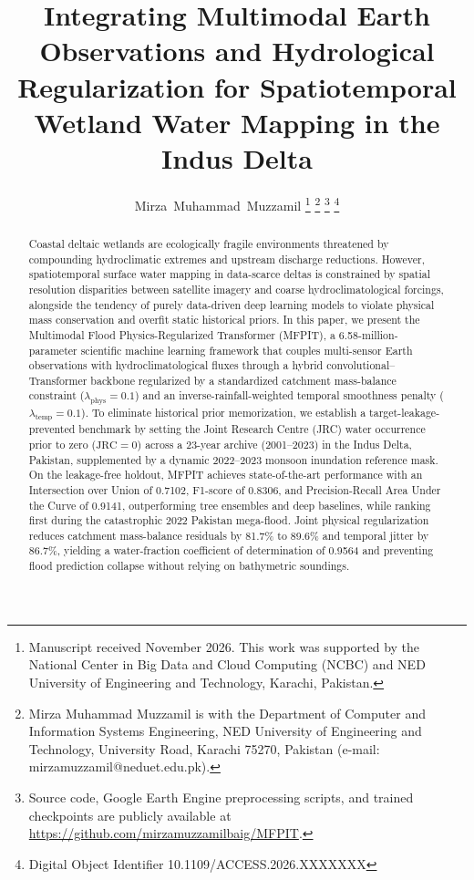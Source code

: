 \documentclass[journal]{IEEEtran}
\begin{document}

\title{Integrating Multimodal Earth Observations and Hydrological Regularization for Spatiotemporal Wetland Water Mapping in the Indus Delta}

\author{Mirza~Muhammad~Muzzamil%
\thanks{Manuscript received November 2026. This work was supported by the National Center in Big Data and Cloud Computing (NCBC) and NED University of Engineering and Technology, Karachi, Pakistan.}%
\thanks{Mirza Muhammad Muzzamil is with the Department of Computer and Information Systems Engineering, NED University of Engineering and Technology, University Road, Karachi 75270, Pakistan (e-mail: mirzamuzzamil@neduet.edu.pk).}%
\thanks{Source code, Google Earth Engine preprocessing scripts, and trained checkpoints are publicly available at \url{https://github.com/mirzamuzzamilbaig/MFPIT}.}%
\thanks{Digital Object Identifier 10.1109/ACCESS.2026.XXXXXXX}}

\maketitle

\begin{abstract}
Coastal deltaic wetlands are ecologically fragile environments threatened by compounding hydroclimatic extremes and upstream discharge reductions. However, spatiotemporal surface water mapping in data-scarce deltas is constrained by spatial resolution disparities between satellite imagery and coarse hydroclimatological forcings, alongside the tendency of purely data-driven deep learning models to violate physical mass conservation and overfit static historical priors. In this paper, we present the Multimodal Flood Physics-Regularized Transformer (MFPIT), a 6.58-million-parameter scientific machine learning framework that couples multi-sensor Earth observations with hydroclimatological fluxes through a hybrid convolutional--Transformer backbone regularized by a standardized catchment mass-balance constraint ($\lambda_{\text{phys}} = 0.1$) and an inverse-rainfall-weighted temporal smoothness penalty ($\lambda_{\text{temp}} = 0.1$). To eliminate historical prior memorization, we establish a target-leakage-prevented benchmark by setting the Joint Research Centre (JRC) water occurrence prior to zero ($\text{JRC}=0$) across a 23-year archive (2001--2023) in the Indus Delta, Pakistan, supplemented by a dynamic 2022--2023 monsoon inundation reference mask. On the leakage-free holdout, MFPIT achieves state-of-the-art performance with an Intersection over Union of 0.7102, F1-score of 0.8306, and Precision-Recall Area Under the Curve of 0.9141, outperforming tree ensembles and deep baselines, while ranking first during the catastrophic 2022 Pakistan mega-flood. Joint physical regularization reduces catchment mass-balance residuals by 81.7\% to 89.6\% and temporal jitter by 86.7\%, yielding a water-fraction coefficient of determination of 0.9564 and preventing flood prediction collapse without relying on bathymetric soundings.
\end{abstract}
\end{document}
